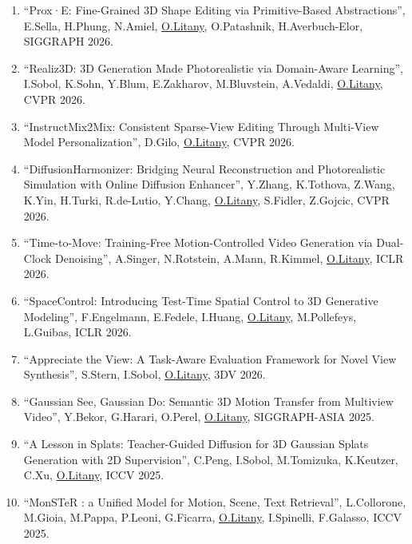 \begin{enumerate}

\item ``Prox·E: Fine-Grained 3D Shape Editing via Primitive-Based Abstractions'', E.Sella, H.Phung, N.Amiel, \underline{O.Litany}, O.Patashnik, H.Averbuch-Elor, SIGGRAPH 2026.

\item ``Realiz3D: 3D Generation Made Photorealistic via Domain-Aware Learning'', I.Sobol, K.Sohn, Y.Blum, E.Zakharov, M.Bluvstein, A.Vedaldi, \underline{O.Litany}, CVPR 2026.

\item ``InstructMix2Mix: Consistent Sparse-View Editing Through Multi-View Model Personalization'', D.Gilo, \underline{O.Litany}, CVPR 2026.

\item ``DiffusionHarmonizer: Bridging Neural Reconstruction and Photorealistic Simulation with Online Diffusion Enhancer'', Y.Zhang, K.Tothova, Z.Wang, K.Yin, H.Turki, R.de-Lutio, Y.Chang, \underline{O.Litany}, S.Fidler, Z.Gojcic, CVPR 2026.

\item ``Time-to-Move: Training-Free Motion-Controlled Video Generation via Dual-Clock Denoising'', A.Singer, N.Rotstein, A.Mann, R.Kimmel, \underline{O.Litany}, ICLR 2026.

\item ``SpaceControl: Introducing Test-Time Spatial Control to 3D Generative Modeling'', F.Engelmann, E.Fedele, I.Huang, \underline{O.Litany}, M.Pollefeys, L.Guibas, ICLR 2026.

\item ``Appreciate the View: A Task-Aware Evaluation Framework for Novel View Synthesis'', S.Stern, I.Sobol, \underline{O.Litany}, 3DV 2026.

\item ``Gaussian See, Gaussian Do: Semantic 3D Motion Transfer from Multiview Video'', Y.Bekor, G.Harari, O.Perel, \underline{O.Litany}, SIGGRAPH-ASIA 2025.

\item ``A Lesson in Splats: Teacher-Guided Diffusion for 3D Gaussian Splats Generation with 2D Supervision'', C.Peng, I.Sobol, M.Tomizuka, K.Keutzer, C.Xu, \underline{O.Litany}, ICCV 2025.

\item ``MonSTeR : a Unified Model for Motion, Scene, Text Retrieval'', L.Collorone, M.Gioia, M.Pappa, P.Leoni, G.Ficarra, \underline{O.Litany}, I.Spinelli, F.Galasso, ICCV 2025.


\end{enumerate}
